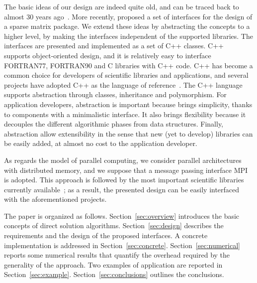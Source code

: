 \documentclass[acmtocl]{acmtrans2m}
\begin{document}
The basic ideas of our design are indeed quite old, and can be traced back to
almost 30 years ago~\cite{duff79performance}. More recently,
\cite{george99object} proposed a set of interfaces for the design of a
sparse matrix package. We extend these ideas by abstracting the concepts to
a higher level, by making the interfaces independent of the supported
libraries. The interfaces are presented and implemented as a
set of C++ classes.  C++~\cite{cppbook}
supports object-oriented design, and it is relatively easy to interface
FORTRAN77, FORTRAN90 and C libraries with C++ code. C++ has become a common
choice for developers  of scientific libraries and applications, and several
projects have adopted C++ as the language of
reference~\cite{heroux05trilinos}. The C++ language
supports abstraction through classes, inheritance and polymorphism. For
application developers, abstraction is important because brings simplicity,
thanks to components with a minimalistic interface. It also brings flexibility
because it decouples the different algorithmic phases from data structures.
Finally, abstraction allow extensibility in the sense that new (yet to
                                                                develop)
libraries can be easily added, at almost no cost to the application developer.

%
%
As regards the model of parallel computing,
we consider parallel architectures with distributed memory, and we suppose
that a message passing interface MPI~\cite{gropp98mpi} is adopted.
This approach is followed by the most important scientific libraries currently
available~\cite{heroux05trilinos,petsc-user-ref,falgout02hypre}; as a result, the presented
design can be easily interfaced with the aforementioned projects.

\smallskip

The paper is organized as follows. Section~\ref{sec:overview} introduces the
basic concepts of direct solution algorithms. Section~\ref{sec:design}
describes the requirements and the design of the proposed
interfaces. A concrete implementation is addressed in
Section~\ref{sec:concrete}. Section~\ref{sec:numerical} reports some
numerical results that quantify the overhead required by the generality of
the approach. Two
examples of application are reported in Section~\ref{sec:example}.
Section~\ref{sec:conclusions} outlines the conclusions.

\end{document}
